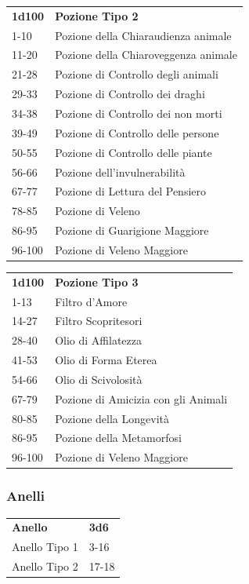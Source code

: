 \begin{multicols}{2}
\medskip

\begin{tabular}{ll}
\textbf{1d100} & \textbf{Pozione Tipo 2}\\
1-10   &Pozione della Chiaraudienza animale\\
11-20  &Pozione della Chiaroveggenza animale\\
21-28  &Pozione di Controllo degli animali\\
29-33  &Pozione di Controllo dei draghi\\
34-38  &Pozione di Controllo dei non morti\\
39-49  &Pozione di Controllo delle persone\\
50-55  &Pozione di Controllo delle piante\\
56-66  &Pozione dell’invulnerabilità\\
67-77  &Pozione di Lettura del Pensiero\\
78-85  &Pozione di Veleno\\
86-95  &Pozione di Guarigione Maggiore\\
96-100 &Pozione di Veleno Maggiore\\
\end{tabular}

\medskip

\begin{tabular}{ll}
\textbf{1d100} & \textbf{Pozione Tipo 3}\\
1-13  & Filtro d'Amore\\
14-27 & Filtro Scopritesori\\
28-40 & Olio di Affilatezza\\
41-53 & Olio di Forma Eterea\\
54-66 & Olio di Scivolosità\\
67-79 & Pozione di Amicizia con gli Animali\\
80-85 & Pozione della Longevità\\
86-95 & Pozione della Metamorfosi\\
96-100& Pozione di Veleno Maggiore\\
\end{tabular}

\subsubsection{Anelli}

\begin{tabular}{ll}
\textbf{Anello}&\textbf{3d6}\\
Anello Tipo 1 &3-16\\
Anello Tipo 2 &17-18\\
\end{tabular}


\end{multicols}
